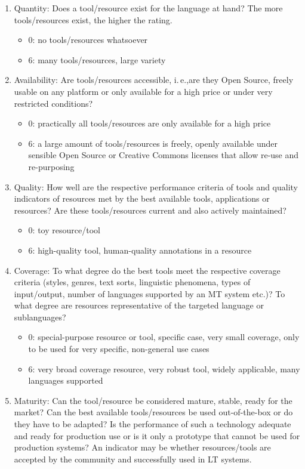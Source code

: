 \begin{multicols}{2}
\begin{enumerate}
\item Quantity: Does a tool/resource exist for the language at hand? The more tools/resources exist, the higher the rating.
\begin{itemize}
\item 0: no tools/resources whatsoever
\item 6: many tools/resources, large variety
\end{itemize}
\item Availability: Are tools/resources accessible, i.\,e.,are they Open Source, freely usable on any platform or only available for a high price or under very restricted conditions?
\begin{itemize}
\item 0: practically all tools/resources are only available for a high price
\item 6: a large amount of tools/resources is freely, openly available under sensible Open Source or Creative Commons licenses that allow re-use and re-purposing\cite{f31}
\end{itemize}
\item Quality: How well are the respective performance criteria of tools and quality indicators of resources met by the best available tools, applications or resources? Are these tools/resources current and also actively maintained?
\begin{itemize}
\item 0: toy resource/tool
\item 6: high-quality tool, human-quality annotations in a resource
\end{itemize}
\item Coverage: To what degree do the best tools meet the respective coverage criteria (styles, genres, text sorts, linguistic phenomena, types of input/output, number of languages supported by an MT system etc.)? To what degree are resources representative of the targeted language or sublanguages?
\begin{itemize}
\item 0: special-purpose resource or tool, specific case, very small coverage, only to be used for very specific, non-general use cases
\item 6: very broad coverage resource, very robust tool, widely applicable, many languages supported
\end{itemize}
\item Maturity: Can the tool/resource be considered mature, stable, ready for the market? Can the best available tools/resources be used out-of-the-box or do they have to be adapted? Is the performance of such a technology adequate and ready for production use or is it only a prototype that cannot be used for production systems? An indicator may be whether resources/tools are accepted by the community and successfully used in LT systems. 

\end{enumerate}
\end{multicols}
